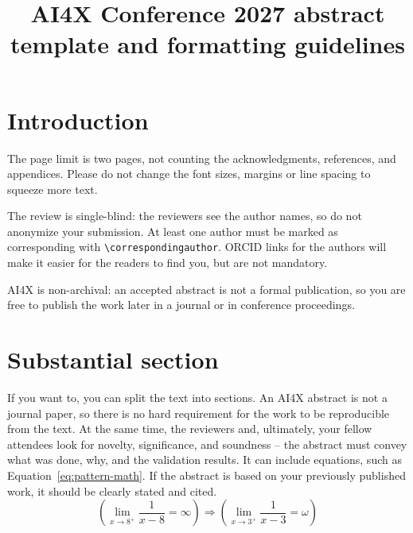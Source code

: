 \documentclass{ai4x}
\title{AI4X Conference 2027 abstract template and formatting guidelines}
\begin{document}
\thispagestyle{fancy}

\section{Introduction}
\label{sec:introduction}
The page limit is two pages, not counting the acknowledgments, references, and appendices. Please do not change the font sizes, margins or line spacing to squeeze more text.

The review is single-blind: the reviewers see the author names, so do not anonymize your submission. At least one author must be marked as corresponding with \verb|\correspondingauthor|. ORCID links for the authors will make it easier for the readers to find you, but are not mandatory.

AI4X is non-archival: an accepted abstract is not a formal publication, so you are free to publish the work later in a journal or in conference proceedings.

\section{Substantial section}
\label{sec:substantial}
If you want to, you can split the text into sections. An AI4X abstract is not a journal paper, so there is no hard requirement for the work to be reproducible from the text. At the same time, the reviewers and, ultimately, your fellow attendees look for novelty, significance, and soundness -- the abstract must convey what was done, why, and the validation results. It can include equations, such as Equation~\eqref{eq:pattern-math}. If the abstract is based on your previously published work, it should be clearly stated and cited.
\begin{equation}
    \label{eq:pattern-math}
    \left(\lim_{x\to 8^+}\frac{1}{x-8} = \infty\right)\Rightarrow\left(\lim_{x\to 3^+}\frac{1}{x-3} = \omega\right)
\end{equation}
\end{document}
